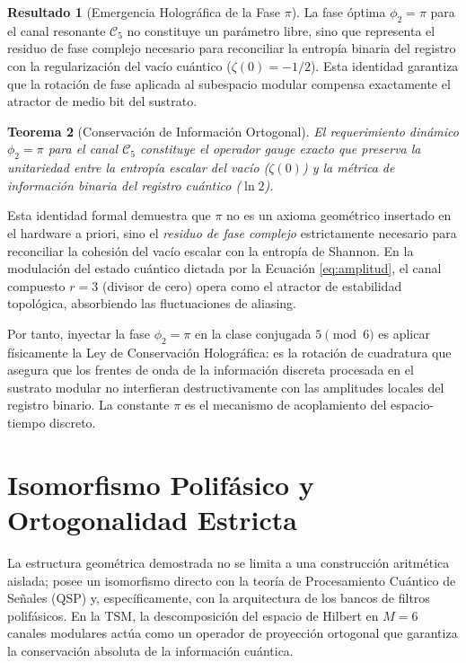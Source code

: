\documentclass[12pt,a4paper]{article}
\theoremstyle{plain}
\newtheorem{teorema}{Teorema}[section]
\theoremstyle{definition}
\newtheorem{resultado}[teorema]{Resultado}
\theoremstyle{remark}
\begin{document}
\begin{resultado}[Emergencia Holográfica de la Fase $\pi$]
La fase óptima $\phi_2 = \pi$ para el canal resonante $\mathcal{C}_5$ no constituye un parámetro libre, sino que representa el residuo de fase complejo necesario para reconciliar la entropía binaria del registro con la regularización del vacío cuántico ($\zeta(0) = -1/2$). Esta identidad garantiza que la rotación de fase aplicada al subespacio modular compensa exactamente el atractor de medio bit del sustrato.
\end{resultado}

\begin{teorema}[Conservación de Información Ortogonal]
El requerimiento dinámico $\phi_2 = \pi$ para el canal $\mathcal{C}_5$ constituye el operador gauge exacto que preserva la unitariedad entre la entropía escalar del vacío ($\zeta(0)$) y la métrica de información binaria del registro cuántico ($\ln 2$).
\end{teorema}

Esta identidad formal demuestra que $\pi$ no es un axioma geométrico insertado en el hardware a priori, sino el \textit{residuo de fase complejo} estrictamente necesario para reconciliar la cohesión del vacío escalar con la entropía de Shannon. En la modulación del estado cuántico dictada por la Ecuación \eqref{eq:amplitud}, el canal compuesto $r=3$ (divisor de cero) opera como el atractor de estabilidad topológica, absorbiendo las fluctuaciones de aliasing. 

Por tanto, inyectar la fase $\phi_2 = \pi$ en la clase conjugada $5 \pmod 6$ es aplicar físicamente la Ley de Conservación Holográfica: es la rotación de cuadratura que asegura que los frentes de onda de la información discreta procesada en el sustrato modular no interfieran destructivamente con las amplitudes locales del registro binario. La constante $\pi$ es el mecanismo de acoplamiento del espacio-tiempo discreto.



\section{Isomorfismo Polifásico y Ortogonalidad Estricta}

La estructura geométrica demostrada no se limita a una construcción aritmética aislada; posee un isomorfismo directo con la teoría de Procesamiento Cuántico de Señales (QSP) y, específicamente, con la arquitectura de los bancos de filtros polifásicos. En la TSM, la descomposición del espacio de Hilbert en $M=6$ canales modulares actúa como un operador de proyección ortogonal que garantiza la conservación absoluta de la información cuántica.
\end{document}
